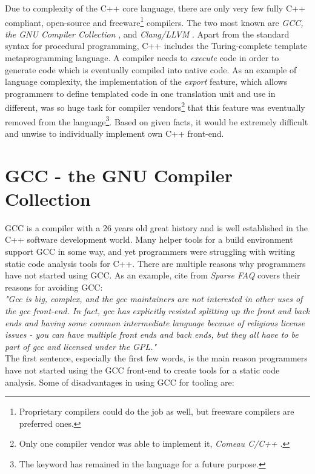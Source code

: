 Due to complexity of the C++ core language, there are only very few fully C++ compliant, open-source and freeware\footnote{Proprietary compilers could do the job as well, but freeware compilers are preferred ones.} compilers. The two most known are \emph{GCC, the GNU Compiler Collection} \cite{gcc}, and \emph{Clang/LLVM} \cite{clang}. Apart from the standard syntax for procedural programming, C++ includes the Turing-complete template metaprogramming language. A compiler needs to \textit{execute} code in order to generate code which is eventually compiled into native code. As an example of language complexity, the implementation of the \emph{export} feature, which allows programmers to define templated code in one translation unit and use in different, was so huge task for compiler vendors\footnote{Only one compiler vendor was able to implement it, \emph{Comeau C/C++} \cite{comeau}.} that this feature was eventually removed from the language\footnote{The  keyword has remained in the language for a future purpose.}. Based on given facts, it would be extremely difficult and unwise to individually implement own C++ front-end.

\section{GCC - the GNU Compiler Collection}
GCC is a compiler with a 26 years old great history and is well established in the C++ software development world. Many helper tools for a build environment support GCC in some way, and yet programmers were struggling with writing static code analysis tools for C++. There are multiple reasons why programmers have not started using GCC. As an example, cite from \emph{Sparse FAQ} \cite{sparse} covers their reasons for avoiding GCC: \\

\textit{"Gcc is big, complex, and the gcc maintainers are not interested in other uses of the gcc front-end.  In fact, gcc has explicitly resisted splitting up the front and back ends and having some common intermediate language because of religious license issues - you can have multiple front ends and back ends, but they all have to be part of gcc and licensed under the GPL."}\\

The first sentence, especially the first few words, is the main reason programmers have not started using the GCC front-end to create tools for a static code analysis. Some of disadvantages in using GCC for tooling are:

